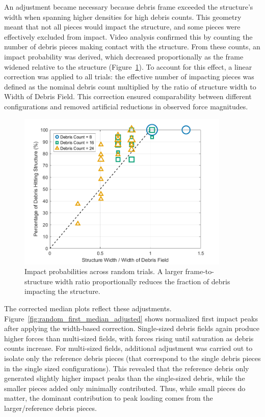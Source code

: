 \documentclass{article}
\begin{document}
{An adjustment became necessary because debris frame exceeded the structure’s width when spanning higher densities for high debris counts. This geometry meant that not all pieces would impact the structure, and some pieces were effectively excluded from impact. Video analysis confirmed this by counting the number of debris pieces making contact with the structure. From these counts, an impact probability was derived, which decreased proportionally as the frame widened relative to the structure (Figure~\ref{fig:impact_probabilities}). To account for this effect, a linear correction was applied to all trials: the effective number of impacting pieces was defined as the nominal debris count multiplied by the ratio of structure width to Width of Debris Field. This correction ensured comparability between different configurations and removed artificial reductions in observed force magnitudes.

\begin{figure}[htbp]
    \centering
    \includegraphics[width=0.9\textwidth]{Impact_probabilities.png}
    \caption{Impact probabilities across random trials. A larger frame-to-structure width ratio proportionally reduces the fraction of debris impacting the structure.}
    \label{fig:impact_probabilities}
\end{figure}

The corrected median plots reflect these adjustments. Figure~\ref{fig:random_first_median_adjusted} shows normalized first impact peaks after applying the width-based correction. Single-sized debris fields again produce higher forces than multi-sized fields, with forces rising until saturation as debris counts increase. For multi-sized fields, additional adjustment was carried out to isolate only the reference debris pieces (that correspond to the single debris pieces in the single sized configurations). This revealed that the reference  debris only generated slightly higher impact peaks than the single-sized debris, while the smaller pieces added only minimally contributed. Thus, while small pieces do matter, the dominant contribution to peak loading comes from the larger/reference debris pieces.

}
\end{document}
